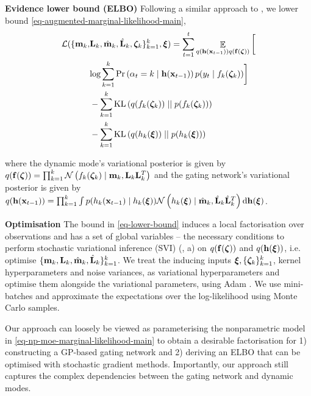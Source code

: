 \documentclass[twoside]{article}
\DeclareMathOperator{\E}{\mathbb{E}}
\newcommand{\numData}{\ensuremath{t}}
\newcommand{\modeInd}{\ensuremath{k}}
\newcommand{\NumData}{\ensuremath{\MakeUppercase{\numData}}}
\newcommand{\ModeInd}{\ensuremath{\MakeUppercase{\modeInd}}}
\newcommand{\singleData}[1]{\ensuremath{#1_{\numData}}}
\newcommand{\mode}[1]{\ensuremath{#1_{\modeInd}}}
\newcommand{\x}{\ensuremath{\mathbf{x}}}
\newcommand{\y}{\ensuremath{y}}
\newcommand{\dataset}{\ensuremath{\mathcal{D}}}
\newcommand{\singleInput}{\ensuremath{\x_{\numData-1}}}
\newcommand{\singleOutput}{\ensuremath{\singleData{\y}}}
\newcommand{\gatingFunc}{\ensuremath{h}}
\newcommand{\GatingFunc}{\ensuremath{\mathbf{\gatingFunc}}}
\begin{document}
\textbf{Evidence lower bound (ELBO)}
Following a similar approach to \cite{hensmanGaussian2013,hensmanScalable2015},
we lower bound \cref{eq-augmented-marginal-likelihood-main},
\begin{align} \label{eq-lower-bound}
\mathcal{L}(\{\mode{\mathbf{m}}, &\mode{\mathbf{L}}, \mode{\hat{\mathbf{m}}}, \mode{\hat{\mathbf{L}}}, \expertInducingInput\}_{\modeInd=1}^{\ModeInd}, \gatingInducingInput) =
\sum_{\timeInd=1}^{\NumData}
\E_{\gatingsVariational \expertsInducingVariational}
\bigg[ \nonumber \\
&\text{log} \sum_{\modeInd=1}^{\ModeInd} \singleGatingLikelihood  \singleExpertGivenInducing \bigg] \nonumber \\
&- \expertsKL \nonumber \\
&- \gatingsKL
\end{align}

where the dynamic mode's variational posterior is given by
\(\expertsInducingVariational = \prod_{\modeInd=1}^{\ModeInd} \mathcal{N}\left(\expertInducingOutput \mid \mode{\mathbf{m}}, \mode{\mathbf{L}} \mode{\mathbf{L}}^{T} \right)\)
and the gating network's variational posterior is given by
\(\gatingsVariational = \prod_{\modeInd=1}^{\ModeInd} \int \singleLatentGatingGivenInducing \mathcal{N}\left(\gatingInducingOutput \mid \mode{\hat{\mathbf{m}}}, \mode{\hat{\mathbf{L}}}\mode{\hat{\mathbf{L}}}^{T} \right) \text{d}\GatingFunc(\gatingInducingInput)\).

\textbf{Optimisation}
The bound in \cref{eq-lower-bound} induces a local factorisation over observations and has a set of global variables
-- the necessary conditions to perform stochastic variational inference (SVI) (, a) on
\(q(\mathbf{f}(\bm{\zeta}))\) and \(\gatingsInducingVariational\), i.e.
optimise \(\{\mode{\mathbf{m}}, \mode{\mathbf{L}}, \mode{\hat{\mathbf{m}}}, \mode{\hat{\mathbf{L}}}\}_{\modeInd=1}^{\ModeInd}\).
We treat the inducing inputs \(\gatingInducingInput,\{\expertInducingInput\}_{\modeInd=1}^{\ModeInd}\),
kernel hyperparameters and noise variances, as
variational hyperparameters and optimise them alongside the variational parameters, using Adam \citep{kingmaAdam2017}.
We use mini-batches and approximate the expectations over the log-likelihood using Monte Carlo samples.

Our approach can loosely be viewed as parameterising the nonparametric model in \cref{eq-np-moe-marginal-likelihood-main} to obtain a desirable
factorisation for 1) constructing a GP-based gating network and 2) deriving an ELBO that can be optimised with stochastic gradient methods.
Importantly, our approach still captures the complex dependencies between the gating network and dynamic modes.
\end{document}
